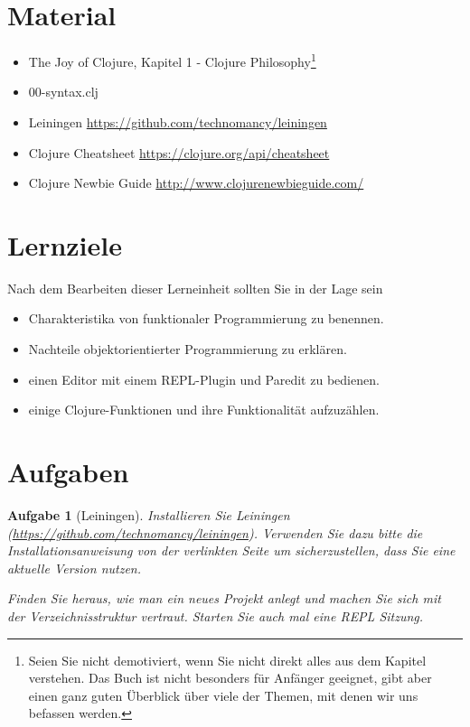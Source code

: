 \documentclass[11pt,a4paper]{article}
\newcounter{numb}
\theoremstyle{break}
\newtheorem{aufgabe}{Aufgabe}[numb]
\begin{document}
\section{Material} 

\begin{itemize}
    \item The Joy of Clojure, Kapitel 1 - Clojure Philosophy\footnote{Seien Sie nicht demotiviert, wenn Sie nicht direkt alles aus dem Kapitel verstehen. Das Buch ist nicht besonders f\"ur Anf\"anger geeignet, gibt aber einen ganz guten \"Uberblick \"uber viele der Themen, mit denen wir uns befassen werden.}
    \item 00-syntax.clj
    \item Leiningen \url{https://github.com/technomancy/leiningen}
    \item Clojure Cheatsheet \url{https://clojure.org/api/cheatsheet}
    \item Clojure Newbie Guide \url{http://www.clojurenewbieguide.com/}
\end{itemize}


\section{Lernziele}

Nach dem Bearbeiten dieser Lerneinheit sollten Sie in der Lage sein

\begin{itemize}
    \item Charakteristika von funktionaler Programmierung zu benennen.
    \item Nachteile objektorientierter Programmierung zu erkl\"aren.
    \item einen Editor mit einem REPL-Plugin und Paredit zu bedienen.
    \item einige Clojure-Funktionen und ihre Funktionalität aufzuzählen.
\end{itemize}

\section{Aufgaben}


\begin{aufgabe}[Leiningen]
    Installieren Sie Leiningen (\url{https://github.com/technomancy/leiningen}).
    Verwenden Sie dazu bitte die Installationsanweisung von der verlinkten Seite
    um sicherzustellen, dass Sie eine aktuelle Version nutzen.

    Finden Sie heraus, wie man ein neues Projekt anlegt
    und machen Sie sich mit der Ver\-zeich\-nis\-struk\-tur vertraut.
    Starten Sie auch mal eine REPL Sitzung.
\end{aufgabe}
\end{document}
